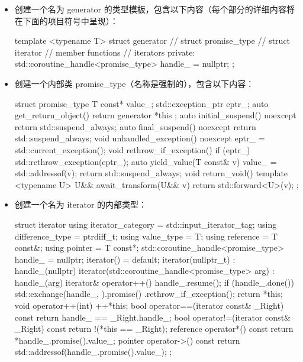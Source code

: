 \begin{itemize}
\item
创建一个名为 generator 的类型模板，包含以下内容（每个部分的详细内容将在下面的项目符号中呈现）：

\begin{cpp}
template <typename T>
struct generator
{
    // struct promise_type
    // struct iterator
    // member functions
    // iterators
private:
    std::coroutine_handle<promise_type> handle_ = nullptr;
};
\end{cpp}

\item
创建一个内部类 promise\_type（名称是强制的），包含以下内容：

\begin{cpp}
struct promise_type
{
    T const*             value_;
    std::exception_ptr   eptr_;
    auto get_return_object()
    { return generator{ *this }; }
    auto initial_suspend() noexcept
    { return std::suspend_always{}; }
    auto final_suspend() noexcept
    { return std::suspend_always{}; }
    void unhandled_exception() noexcept
    {
        eptr_ = std::current_exception();
    }
    void rethrow_if_exception()
    {
        if (eptr_)
        {
            std::rethrow_exception(eptr_);
        }
    }
    auto yield_value(T const& v)
    {
        value_ = std::addressof(v);
        return std::suspend_always{};
    }
    void return_void() {}
    template <typename U>
    U&& await_transform(U&& v)
    {
        return std::forward<U>(v);
    }
};
\end{cpp}

\item
创建一个名为 iterator 的内部类型：

\begin{cpp}
struct iterator
{
    using iterator_category = std::input_iterator_tag;
    using difference_type   = ptrdiff_t;
    using value_type        = T;
    using reference         = T const&;
    using pointer           = T const*;
    std::coroutine_handle<promise_type> handle_ = nullptr;
    iterator() = default;
    iterator(nullptr_t) : handle_(nullptr) {}
    iterator(std::coroutine_handle<promise_type> arg)
    : handle_(arg)
    {}
    iterator& operator++()
    {
        handle_.resume();
        if (handle_.done())
        {
            std::exchange(handle_, {}).promise()
                                      .rethrow_if_exception();
        }
        return *this;
    }
    void operator++(int)
    {
        ++*this;
    }
    bool operator==(iterator const& _Right) const
    {
        return handle_ == _Right.handle_;
    }
    bool operator!=(iterator const& _Right) const
    {
        return !(*this == _Right);
    }
    reference operator*() const
    {
        return *handle_.promise().value_;
    }
    pointer operator->() const
    {
        return std::addressof(handle_.promise().value_);
    }
};
\end{cpp}


\end{itemize}
